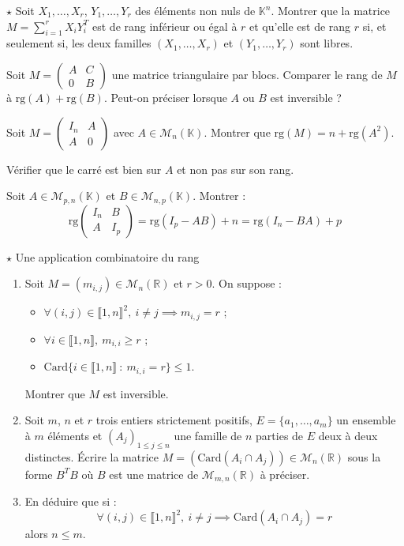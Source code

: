 \documentclass[french,a4paper]{article}
\newcommand{\R}{\mathbb{R}}
\newcommand{\K}{\mathbb{K}}
\newcommand{\card}{\text{Card}}
\theoremstyle{plain}
\theoremstyle{definition}
\theoremstyle{remark}
\begin{document}
\begin{ex}{$\star$}
	Soit $X_1,\ldots,X_r$, $Y_1,\ldots,Y_r$ des éléments non nuls de $\K^n$. Montrer que la matrice $M=\displaystyle\sum_{i=1}^{r}X_iY_i^T$ est de rang inférieur ou égal à $r$ et qu'elle est de rang $r$ si, et seulement si, les deux familles $(X_1,\ldots,X_r)$ et $(Y_1,\ldots,Y_r)$ sont libres.
\end{ex}

\begin{ex}{}
	Soit $M=\displaystyle\begin{pmatrix}
		A&C\\
		0&B
	\end{pmatrix}$ une matrice triangulaire par blocs. Comparer le rang de $M$ à $\text{rg}(A)+\text{rg}(B)$. Peut-on préciser lorsque $A$ ou $B$ est inversible ?
\end{ex}

\begin{ex}{}
		Soit $M=\displaystyle\begin{pmatrix}
		I_n&A\\
		A&0
	\end{pmatrix}$ avec $A\in\mathcal{M}_n(\K)$. Montrer que $\text{rg}(M)=n+\text{rg}(A^2)$.
\end{ex}
Vérifier que le carré est bien sur $A$ et non pas sur son rang.

\begin{ex}{}
	Soit $A\in\mathcal{M}_{p,n}(\K)$ et $B\in\mathcal{M}_{n,p}(\K)$. Montrer : $$\text{rg}\begin{pmatrix}
		I_n&B\\
		A&I_p
	\end{pmatrix}=\text{rg}(I_p-AB)+n=\text{rg}(I_n-BA)+p$$
\end{ex}

\begin{ex}{$\star$ Une application combinatoire du rang}
	\begin{enumerate}
		\item Soit $M=(m_{i,j})\in\mathcal{M}_n(\R)$ et $r>0$. On suppose :
		\begin{itemize}
			\item $\forall (i,j)\in\llbracket1,n\rrbracket^2,\ i\ne j\implies m_{i,j}=r$ ;
			\item $\forall i\in\llbracket1,n\rrbracket,\ m_{i,i}\geqslant r$ ;
			\item $\card\{i\in\llbracket1,n\rrbracket\ : \ m_{i,i}=r\}\leqslant 1$.
		\end{itemize} Montrer que $M$ est inversible.
		\item Soit $m$, $n$ et $r$ trois entiers strictement positifs, $E=\{a_1,\ldots,a_m\}$ un ensemble à $m$ éléments et $(A_j)_{1\leqslant j\leqslant n}$ une famille de $n$ parties de $E$ deux à deux distinctes. Écrire la matrice $M=(\card(A_i\cap A_j))\in\mathcal{M}_n(\R)$ sous la forme $B^TB$ où $B$ est une matrice de $\mathcal{M}_{m,n}(\R)$ à préciser.
		\item En déduire que si : $$\forall (i,j)\in\llbracket1,n\rrbracket^2,\ i\ne j\implies \card(A_i\cap A_j)=r$$ alors $n\leqslant m$.
	\end{enumerate}
\end{ex}
\end{document}
